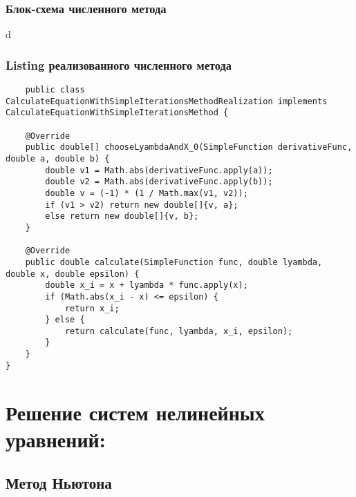 \subsubsection{Блок-схема численного метода}
d

\subsubsection{Listing реализованного численного метода}
\tiny
\begin{verbatim}
    public class CalculateEquationWithSimpleIterationsMethodRealization implements CalculateEquationWithSimpleIterationsMethod {

    @Override
    public double[] chooseLyambdaAndX_0(SimpleFunction derivativeFunc, double a, double b) {
        double v1 = Math.abs(derivativeFunc.apply(a));
        double v2 = Math.abs(derivativeFunc.apply(b));
        double v = (-1) * (1 / Math.max(v1, v2));
        if (v1 > v2) return new double[]{v, a};
        else return new double[]{v, b};
    }

    @Override
    public double calculate(SimpleFunction func, double lyambda, double x, double epsilon) {
        double x_i = x + lyambda * func.apply(x);
        if (Math.abs(x_i - x) <= epsilon) {
            return x_i;
        } else {
            return calculate(func, lyambda, x_i, epsilon);
        }
    }
}
\end{verbatim}
\normalsize


\section{Решение систем нелинейных уравнений:}

\subsection{Метод Ньютона}

